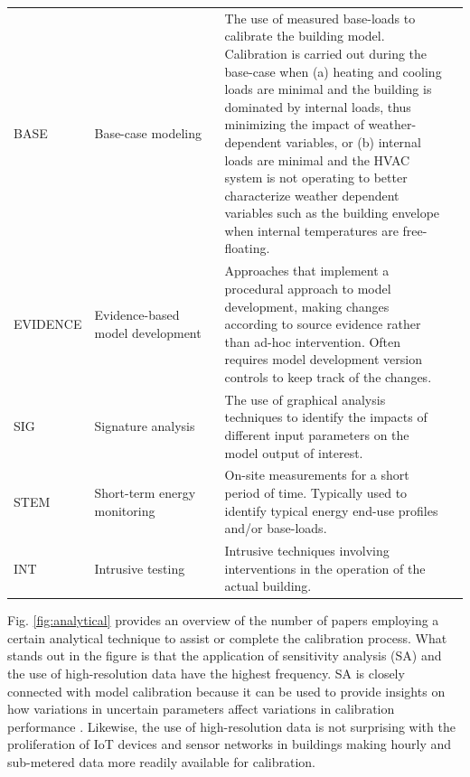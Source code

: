 \documentclass[review]{elsarticle}
\begin{document}
\begin{table}[h!]
{\begin{tabular}{p{0.15\linewidth} p{0.3\linewidth} p{0.85\linewidth}}
  BASE & Base-case modeling & The use of measured base-loads to calibrate the building model. Calibration is carried out during the base-case when (a) heating and cooling loads are minimal and the building is dominated by internal loads, thus minimizing the impact of weather-dependent variables, or (b) internal loads are minimal and the HVAC system is not operating to better characterize weather dependent variables such as the building envelope when internal temperatures are free-floating. \\  
  EVIDENCE & Evidence-based model development & Approaches that implement a procedural approach to model development, making changes according to source evidence rather than ad-hoc intervention. Often requires model development version controls to keep track of the changes. & \cite{raftery2011calibrating} \\
  SIG & Signature analysis & The use of graphical analysis techniques to identify the impacts of different input parameters on the model output of interest. \\
  STEM & Short-term energy monitoring & On-site measurements for a short period of time. Typically used to identify typical energy end-use profiles and/or base-loads. \\
  INT & Intrusive testing & Intrusive techniques involving interventions in the operation of the actual building. \\
  \hline
\end{tabular}}
\end{table}

Fig. \ref{fig:analytical} provides an overview of the number of papers employing a certain analytical technique to assist or complete the calibration process. What stands out in the figure is that the application of sensitivity analysis (SA) and the use of high-resolution data have the highest frequency. SA is closely connected with model calibration because it can be used to provide insights on how variations in uncertain parameters affect variations in calibration performance \cite{pianosi2016sensitivity}. Likewise, the use of high-resolution data is not surprising with the proliferation of IoT devices and sensor networks in buildings making hourly and sub-metered data more readily available for calibration. 
\end{document}
